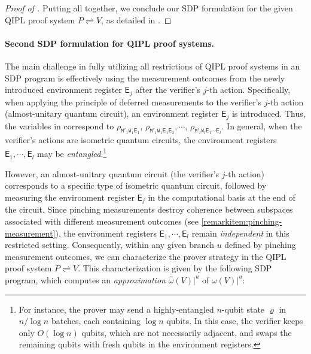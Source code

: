\documentclass[11pt, a4paper]{article}
\numberwithin{equation}{section}
\numberwithin{figure}{section}
\newcommand{\QIPL}{\textnormal{\textsf{QIPL}}\xspace}
\newcommand{\protocol}[2]{{#1}\!\rightleftharpoons\!{#2}}
\newcommand{\sfE}{\mathsf{E}}
\newcommand{\ttM}{\mathtt{M}}
\newcommand{\ttW}{\mathtt{W}}
\begin{document}
\begin{proof}[Proof of ]
    Putting  all together, we conclude our SDP formulation for the given \QIPL{} proof system $\protocol{P}{V}$, as detailed in .
\end{proof}

\paragraph{Second SDP formulation for \QIPL{} proof systems.} 

The main challenge in fully utilizing all restrictions of \QIPL{} proof systems in an SDP program is effectively using the measurement outcomes from the newly introduced environment register $\sfE_j$ after the verifier's $j$-th action. Specifically, when applying the principle of deferred measurements to the verifier's $j$-th action (almost-unitary quantum circuit), an environment register $\sfE_j$ is introduced. 
Thus, the variables in  correspond to $\rho_{\ttM'_1\ttW_1\sfE_1}$, $\rho_{\ttM'_1\ttW_1\sfE_1\sfE_2}, \cdots$, $\rho_{\ttM'_l\ttW_l\sfE_1\cdots\sfE_l}$. In general, when the verifier's actions are isometric quantum circuits, the environment registers $\sfE_1,\cdots,\sfE_l$ may be \textit{entangled}.\footnote{For instance, the prover may send a highly-entangled $n$-qubit state $\varrho$ in $n/\log{n}$ batches, each containing $\log{n}$ qubits. In this case, the verifier keeps only $O(\log n)$ qubits, which are not necessarily adjacent, and swaps the remaining qubits with fresh qubits in the environment registers.}

However, an almost-unitary quantum circuit (the verifier's $j$-th action) corresponds to a specific type of isometric quantum circuit, followed by measuring the environment register $\sfE_j$ in the computational basis at the end of the circuit. 
Since pinching measurements destroy coherence between subspaces associated with different measurement outcomes (see \ref{remarkitem:pinching-measurement}), the environment registers $\sfE_1,\cdots,\sfE_l$ remain \textit{independent} in this restricted setting. 
Consequently, within any given branch $u$ defined by pinching measurement outcomes, we can characterize the prover strategy in the \QIPL{} proof system $\protocol{P}{V}$. This characterization is given by the following SDP program, which computes an \textit{approximation} $\widehat{\omega}(V)|^u$ of $\omega(V)|^u$: 
\end{document}
